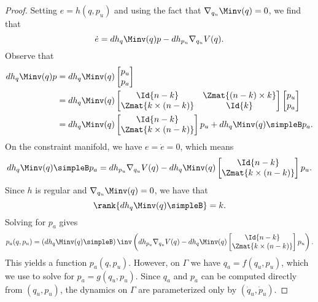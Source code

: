 \begin{proof}
    Setting \(e = h(q,p_u)\) and using the fact that 
    \(\nabla_{q_u}\Minv(q) = 0\), we find that
    \[
        \dot{e} = dh_q\Minv(q)p - dh_{p_u}\nabla_{q_u}V(q)
        .
    \]
    Observe that
    \begin{align*}
        dh_q\Minv(q)p &= dh_q\Minv(q) \begin{bmatrix}p_u \\ p_a \end{bmatrix} \\
          &= dh_q\Minv(q) \begin{bmatrix}
              \Id{n-k} & \Zmat{(n-k)\times k} \\
              \Zmat{k \times(n-k)} & \Id{k} 
              \end{bmatrix} \begin{bmatrix} p_u \\ p_a \end{bmatrix} \\
        &= dh_q\Minv(q)\begin{bmatrix} \Id{n-k} \\ \Zmat{k \times
        (n-k)}\end{bmatrix} p_u + dh_q \Minv(q)\simpleB p_a
        .
    \end{align*}
    On the constraint manifold, we have \(e = \dot{e} = 0\), which means
    \[
        dh_q\Minv(q)\simpleB p_a = dh_{p_u}\nabla_{q_u}V(q) -
            dh_q\Minv(q)\begin{bmatrix} 
            \Id{n-k} \\ \Zmat{k \times (n-k)}\end{bmatrix} p_u
        .
    \]
    Since \(h\) is regular and \(\nabla_{q_u}\Minv(q) = 0\), we have that 
    \[
        \rank{dh_q\Minv(q)\simpleB} = k
        .
    \]
    Solving for \(p_a\) gives
    \[
        p_a(q,p_u) = \left(dh_q\Minv(q)\simpleB\right)\inv
        \left(dh_{p_u}\nabla_{q_u}V(q) - 
            dh_q\Minv(q)\begin{bmatrix} 
        \Id{n-k} \\ \Zmat{k \times (n-k)}\end{bmatrix} p_u \right)
        .
    \]
    This yields a function \(p_a(q,p_u)\). However, on \(\Gamma\) we have 
    \(q_a = f(q_u,p_u)\), which we use to solve for \(p_a = g(q_u,p_u)\). 
    Since \(q_a\) and \(p_a\) can be computed directly from \((q_u,p_u)\), the
    dynamics on \(\Gamma\) are parameterized only by \((\dot{q}_u,\dot{p}_u)\).
\end{proof}

